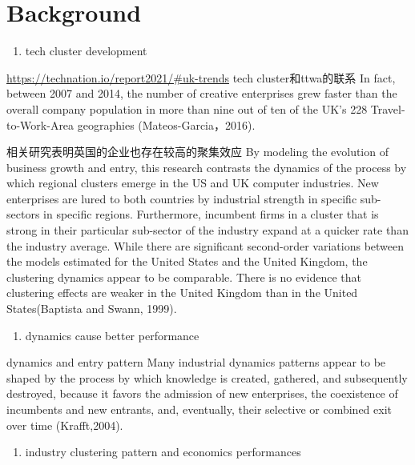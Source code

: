 \documentclass[
  12pt,
  oneside]{book}
\providecommand{\tightlist}{%
  \setlength{\itemsep}{0pt}\setlength{\parskip}{0pt}}
\begin{document}

\hypertarget{background}{%
\section{Background}\label{background}}

\begin{enumerate}
\def\labelenumi{\arabic{enumi}.}
\tightlist
\item
  tech cluster development
\end{enumerate}

\url{https://technation.io/report2021/\#uk-trends}
tech cluster和ttwa的联系
In fact, between 2007 and 2014, the number of creative enterprises grew faster than the overall company population in more than nine out of ten of the UK's 228 Travel-to-Work-Area geographies (Mateos-Garcia，2016).

相关研究表明英国的企业也存在较高的聚集效应
By modeling the evolution of business growth and entry, this research contrasts the dynamics of the process by which regional clusters emerge in the US and UK computer industries. New enterprises are lured to both countries by industrial strength in specific sub-sectors in specific regions. Furthermore, incumbent firms in a cluster that is strong in their particular sub-sector of the industry expand at a quicker rate than the industry average. While there are significant second-order variations between the models estimated for the United States and the United Kingdom, the clustering dynamics appear to be comparable. There is no evidence that clustering effects are weaker in the United Kingdom than in the United States(Baptista and Swann, 1999).

\begin{enumerate}
\def\labelenumi{\arabic{enumi}.}
\setcounter{enumi}{1}
\tightlist
\item
  dynamics cause better performance
\end{enumerate}

dynamics and entry pattern
Many industrial dynamics patterns appear to be shaped by the process by which knowledge is created, gathered, and subsequently destroyed, because it favors the admission of new enterprises, the coexistence of incumbents and new entrants, and, eventually, their selective or combined exit over time (Krafft,2004).

\begin{enumerate}
\def\labelenumi{\arabic{enumi}.}
\setcounter{enumi}{2}
\tightlist
\item
  industry clustering pattern and economics performances
\end{enumerate}
\end{document}
